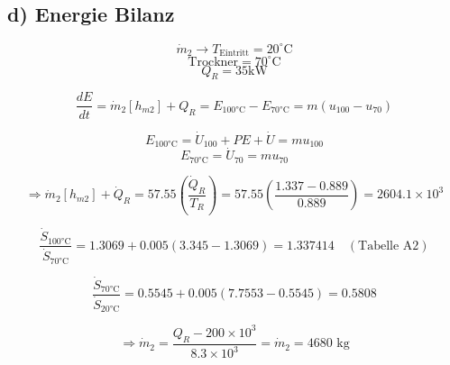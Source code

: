 \subsection*{d) Energie Bilanz}

\[
\dot{m}_2 \rightarrow T_{\text{Eintritt}} = 20^\circ \text{C}
\]
\[
\text{Trockner} = 70^\circ \text{C}
\]
\[
Q_R = 35 \text{kW}
\]

\[
\frac{dE}{dt} = \dot{m}_2 \left[ h_{m2} \right] + Q_R = E_{\text{100°C}} - E_{\text{70°C}} = m \left( u_{100} - u_{70} \right)
\]

\[
E_{\text{100°C}} = \dot{U}_{100} + PE + \dot{U} = m u_{100}
\]
\[
E_{\text{70°C}} = \dot{U}_{70} = m u_{70}
\]

\[
\Rightarrow \dot{m}_2 \left[ h_{m2} \right] + \dot{Q}_R = 57.55 \left( \frac{\dot{Q}_R}{T_R} \right) = 57.55 \left( \frac{1.337 - 0.889}{0.889} \right) = 2604.1 \times 10^3
\]

\[
\frac{\dot{S}_{\text{100°C}}}{\dot{S}_{\text{70°C}}} = 1.3069 + 0.005 \left( 3.345 - 1.3069 \right) = 1.337414 \quad (\text{Tabelle A2})
\]

\[
\frac{\dot{S}_{\text{70°C}}}{\dot{S}_{\text{20°C}}} = 0.5545 + 0.005 \left( 7.7553 - 0.5545 \right) = 0.5808
\]

\[
\Rightarrow \dot{m}_2 = \frac{Q_R - 200 \times 10^3}{8.3 \times 10^3} = \dot{m}_2 = 4680 \text{ kg}
\]